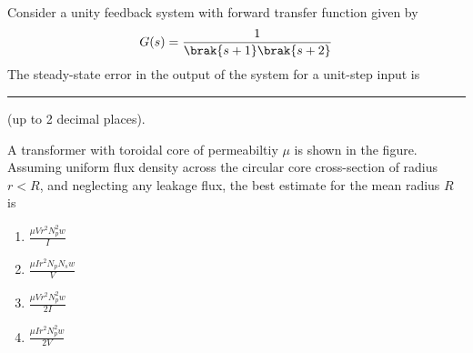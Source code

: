 \item Consider a unity feedback system with forward transfer function given by 
\[
G(s)=\frac{1}{\brak{s+1}\brak{s+2}}
\]
The steady-state error in the output of the system for a unit-step input is \rule{2cm}{0.4pt} (up to 2 decimal places).

\item A transformer with toroidal core of permeabiltiy $\mu$ is shown in the figure. Assuming uniform flux density across the circular core cross-section of radius $r<R$, and neglecting any leakage flux, the best estimate for the mean radius $R$ is


\begin{enumerate}
\item $\frac{\mu Vr^2N_p^2w}{I}$
\item $\frac{\mu Ir^2N_pN_sw}{V}$
\item $\frac{\mu Vr^2N_p^2w}{2I}$
\item $\frac{\mu Ir^2N_p^2w}{2V}$
\end{enumerate}


